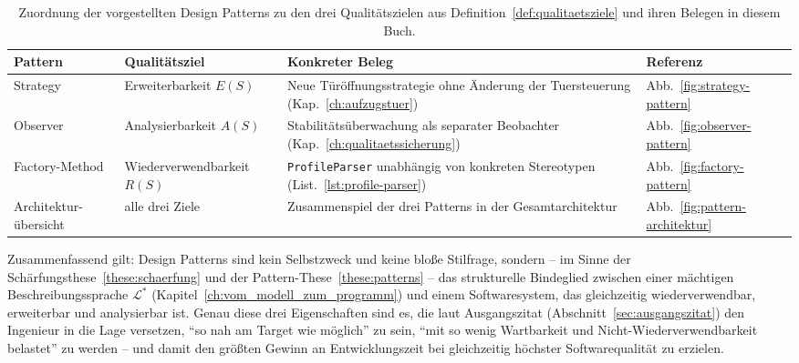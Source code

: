 ﻿\documentclass[a4paper,12pt]{report}
\theoremstyle{definition}
\begin{document}
\begin{table}[H]
\centering
\footnotesize
\begin{tabular}{@{}>{\raggedright\arraybackslash}p{2.0cm}>{\raggedright\arraybackslash}p{2.9cm}>{\raggedright\arraybackslash}p{5.0cm}>{\raggedright\arraybackslash}p{2.3cm}@{}}
\toprule
\textbf{Pattern} & \textbf{Qualitätsziel} & \textbf{Konkreter Beleg} & \textbf{Referenz} \\
\midrule
Strategy & Erweiterbarkeit $E(S)$ & Neue Türöffnungsstrategie ohne Änderung der Tuersteuerung (Kap.~\ref{ch:aufzugstuer}) & Abb.~\ref{fig:strategy-pattern} \\
Observer & Analysierbarkeit $A(S)$ & Stabilitätsüberwachung als separater Beobachter (Kap.~\ref{ch:qualitaetssicherung}) & Abb.~\ref{fig:observer-pattern} \\
Factory-\linebreak Method & Wieder\-ver\-wend\-bar\-keit $R(S)$ & \texttt{ProfileParser} unabhängig von konkreten Stereotypen (List.~\ref{lst:profile-parser}) & Abb.~\ref{fig:factory-pattern} \\
Architektur-\linebreak übersicht & alle drei Ziele & Zusammenspiel der drei Patterns in der Gesamtarchitektur & Abb.~\ref{fig:pattern-architektur} \\
\bottomrule
\end{tabular}
\caption{Zuordnung der vorgestellten Design Patterns zu den drei
Qualitätszielen aus Definition~\ref{def:qualitaetsziele} und ihren Belegen
in diesem Buch.}
\label{tab:pattern-wirkung}
\end{table}

\noindent
Zusammenfassend gilt: Design Patterns sind kein Selbstzweck und keine bloße
Stilfrage, sondern -- im Sinne der Schärfungsthese~\ref{these:schaerfung} und der
Pattern-These~\ref{these:patterns} -- das strukturelle Bindeglied zwischen einer
mächtigen Beschreibungssprache $\mathcal{L}^*$ (Kapitel~\ref{ch:vom_modell_zum_programm})
und einem Softwaresystem, das gleichzeitig wiederverwendbar, erweiterbar und
analysierbar ist. Genau diese drei Eigenschaften sind es, die laut
Ausgangszitat (Abschnitt~\ref{sec:ausgangszitat}) den Ingenieur in die Lage
versetzen, ``so nah am Target wie möglich'' zu sein, ``mit so wenig Wartbarkeit
und Nicht-Wiederverwendbarkeit belastet'' zu werden -- und damit den größten
Gewinn an Entwicklungszeit bei gleichzeitig höchster Softwarequalität zu
erzielen.

\end{document}
